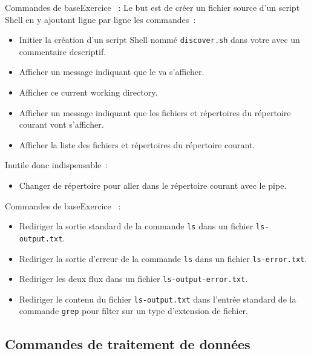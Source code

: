 \documentclass{beamer}
\begin{document}
    \begin{frame}{Commandes de base}{Exercice \execcounterdispinc{}~:}
        Le but est de créer un fichier source d'un script Shell en y ajoutant ligne par ligne les commandes~:
        \begin{itemize}
            \item Initier la création d'un script Shell nommé \lstinline{discover.sh} dans votre  avec un commentaire descriptif.
            \item Afficher un message indiquant que le  va s'afficher.
            \item Afficher ce current working directory.
            \item Afficher un message indiquant que les fichiers et répertoires du répertoire courant vont s'afficher.
            \item Afficher la liste des fichiers et répertoires du répertoire courant.
        \end{itemize}

        Inutile donc indispensable~:
        \begin{itemize}
            \item Changer de répertoire pour aller dans le répertoire courant avec le pipe.
        \end{itemize}
    \end{frame}

    \begin{frame}{Commandes de base}{Exercice \execcounterdispinc{}~:}
        \begin{itemize}
            \item Rediriger la sortie standard de la commande \lstinline{ls} dans un fichier \lstinline{ls-output.txt}.
            \item Rediriger la sortie d'erreur de la commande \lstinline{ls} dans un fichier \lstinline{ls-error.txt}.
            \item Rediriger les deux flux dans un fichier \lstinline{ls-output-error.txt}.
            \item Rediriger le contenu du fichier \lstinline{ls-output.txt} dans l'entrée standard de la commande \lstinline{grep} pour filter sur un type d'extension de fichier.
        \end{itemize}
    \end{frame}

    \subsection{Commandes de traitement de données}\label{subsec:commandes-donnees}
\end{document}
